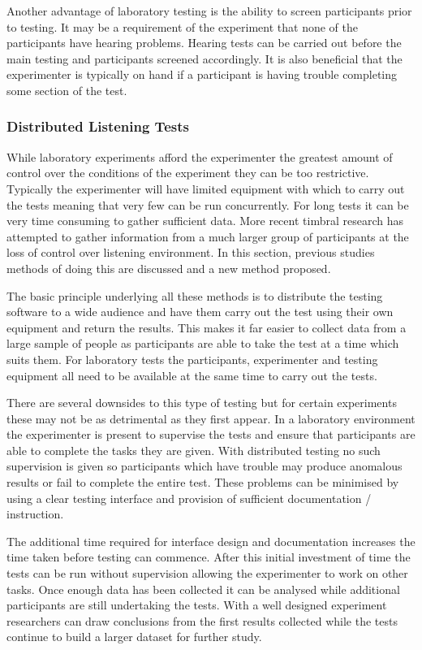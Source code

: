 			Another advantage of laboratory testing is the ability to screen participants prior to testing. It
			may be a requirement of the experiment that none of the participants have hearing problems. Hearing
			tests can be carried out before the main testing and participants screened accordingly. It is also
			beneficial that the experimenter is typically on hand if a participant is having trouble completing
			some section of the test.

		\subsubsection*{Distributed Listening Tests}
			While laboratory experiments afford the experimenter the greatest amount of control over the
			conditions of the experiment they can be too restrictive. Typically the experimenter will have
			limited equipment with which to carry out the tests meaning that very few can be run concurrently.
			For long tests it can be very time consuming to gather sufficient data. More recent timbral research
			has attempted to gather information from a much larger group of participants at the loss of control
			over listening environment. In this section, previous studies methods of doing this are discussed
			and a new method proposed.

			The basic principle underlying all these methods is to distribute the testing software to a wide
			audience and have them carry out the test using their own equipment and return the results. This
			makes it far easier to collect data from a large sample of people as participants are able to take
			the test at a time which suits them. For laboratory tests the participants, experimenter and testing
			equipment all need to be available at the same time to carry out the tests.

			There are several downsides to this type of testing but for certain experiments these may not be as
			detrimental as they first appear. In a laboratory environment the experimenter is present to
			supervise the tests and ensure that participants are able to complete the tasks they are given. With
			distributed testing no such supervision is given so participants which have trouble may produce
			anomalous results or fail to complete the entire test. These problems can be minimised by using a
			clear testing interface and provision of sufficient documentation / instruction.

			The additional time required for interface design and documentation increases the time taken before
			testing can commence. After this initial investment of time the tests can be run without supervision
			allowing the experimenter to work on other tasks. Once enough data has been collected it can be
			analysed while additional participants are still undertaking the tests. With a well designed
			experiment researchers can draw conclusions from the first results collected while the tests
			continue to build a larger dataset for further study.

